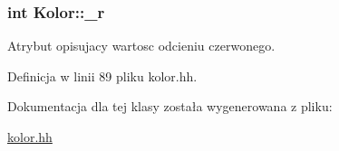 \subsubsection[{\+\_\+r}]{\setlength{\rightskip}{0pt plus 5cm}int Kolor\+::\+\_\+r\hspace{0.3cm}{\ttfamily [private]}}\label{class_kolor_ad887fb53be523b39fbead6a24671751e}
Atrybut opisujacy wartosc odcieniu czerwonego. 

Definicja w linii 89 pliku kolor.\+hh.



Dokumentacja dla tej klasy została wygenerowana z pliku\+:\begin{DoxyCompactItemize}
\item 
\hyperlink{kolor_8hh}{kolor.\+hh}\end{DoxyCompactItemize}
